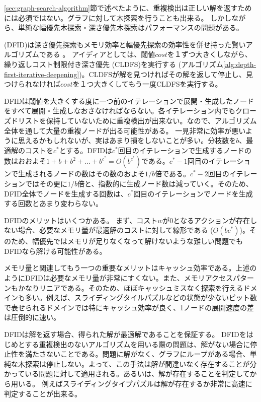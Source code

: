 \ref{sec:graph-search-algorithm}節で述べたように、重複検出は正しい解を返すためには必須ではない。グラフに対して木探索を行うことも出来る。
しかしながら、単純な幅優先木探索・深さ優先木探索はパフォーマンスの問題がある。

 (DFID)は深さ優先探索もメモリ効率と幅優先探索の効率性を併せ持った賢いアルゴリズムである \cite{korf:85a,russelln03}。
アイディアとしては、閾値$cost$を１ずつ大きくしながら、繰り返しコスト制限付き深さ優先 (CLDFS)を実行する (アルゴリズム\ref{alg:depth-first-iterative-deepening})。CLDFSが解を見つければその解を返して停止し、見つけられなければ$cost$を１つ大きくしてもう一度CLDFSを実行する。

DFIDは閾値を大きくする度に一つ前のイテレーションで展開・生成したノードをすべて展開・生成しなおさなければならない。各イテレーション内でもクローズドリストを保持していないために重複検出が出来ない。なので、アルゴリズム全体を通して大量の重複ノードが出る可能性がある。
一見非常に効率が悪いように思えるかもしれないが、実はあまり損をしないことが多い。分枝数を$b$、最適解のコストを$c^*$とする。DFIDは$c^*$回目のイテレーションで生成するノードの数はおおよそ$1 + b + b^2 + ... + b^{c^*} = O(b^{c^*})$である。$c^* - 1$回目のイテレーションで生成されるノードの数はその数のおよそ$1 / b$倍である。$c^* - 2$回目のイテレーションではその更に$1 / b$倍と、指数的に生成ノード数は減っていく。そのため、DFID全体でノードを生成する回数は、$c^*$回目のイテレーションでノードを生成する回数とあまり変わらない。

DFIDのメリットはいくつかある。
まず、コスト$w$が0となるアクションが存在しない場合、必要なメモリ量が最適解のコストに対して線形である ($O(b c^*)$)。そのため、幅優先ではメモリが足りなくなって解けないような難しい問題でもDFIDなら解ける可能性がある。

メモリ量と関連してもう一つの重要なメリットはキャッシュ効率である。上述のようにDFIDは必要なメモリ量が非常にすくない。また、メモリアクセスパターンもかなりリニアである。そのため、ほぼキャッシュミスなく探索を行えるドメインも多い。例えば、スライディングタイルパズルなどの状態が少ないビット数で表せられるドメインでは特にキャッシュ効率が良く、1ノードの展開速度の差は圧倒的に速い\cite{korf:85a}。

DFIDは解を返す場合、得られた解が最適解であることを保証する。
DFIDをはじめとする重複検出のないアルゴリズムを用いる際の問題は、解がない場合に停止性を満たさないことである。問題に解がなく、グラフにループがある場合、単純な木探索は停止しない。よって、この手法は解が間違いなく存在することが分かっている問題に対して適用される。あるいは、解が存在することを判定してから用いる。
例えばスライディングタイプパズルは解が存在するか非常に高速に判定することが出来る。

